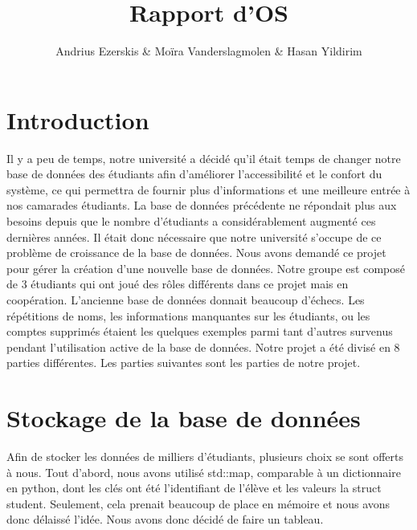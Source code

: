 \documentclass[utf8]{article}
\begin{document}
\begin{titlepage}
    

\author{Andrius Ezerskis \& Moïra Vanderslagmolen \& Hasan Yildirim}
\title{Rapport d'OS}

\maketitle
\end{titlepage}

\section{Introduction}
\par
Il y a peu de temps, notre université a décidé qu'il était temps de changer notre base de données des étudiants afin d'améliorer l'accessibilité et le confort du système, ce qui permettra de fournir plus d'informations et une meilleure entrée à nos camarades étudiants. La base de données précédente ne répondait plus aux besoins depuis que le nombre d'étudiants a considérablement augmenté ces dernières années. Il était donc nécessaire que notre université s'occupe de ce problème de croissance de la base de données.
Nous avons demandé ce projet pour gérer la création d'une nouvelle base de données. Notre groupe est composé de 3 étudiants qui ont joué des rôles différents dans ce projet mais en coopération. L'ancienne base de données donnait beaucoup d'échecs. Les répétitions de noms, les informations manquantes sur les étudiants, ou les comptes supprimés étaient les quelques exemples parmi tant d'autres survenus pendant l'utilisation active de la base de données. Notre projet a été divisé en 8 parties différentes. Les parties suivantes sont les parties de notre projet.
\par


\section{Stockage de la base de données}
\indent{}
\par
Afin de stocker les données de milliers d'étudiants, plusieurs choix se sont offerts à nous. 
Tout d'abord, nous avons utilisé std::map, comparable à un dictionnaire en python, dont les
clés ont été l'identifiant de l'élève et les valeurs la struct student. Seulement, cela
prenait beaucoup de place en mémoire et nous avons donc délaissé l'idée. Nous avons donc décidé de faire un tableau.
\par
\end{document}
